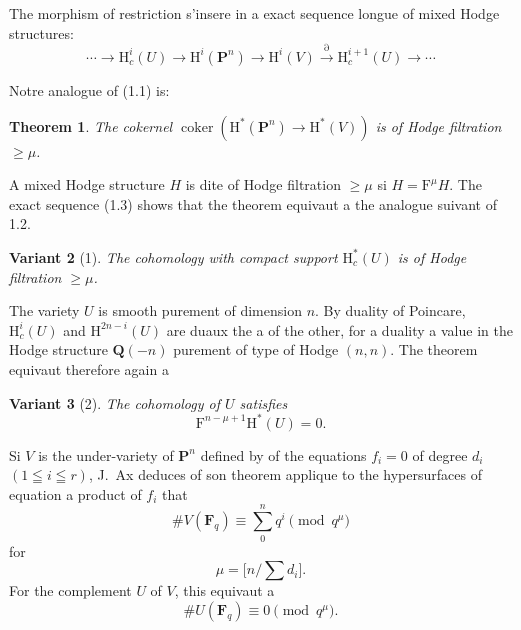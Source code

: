 \documentclass[12pt,a4paper]{article}
\theoremstyle{plain}
\newtheorem{theorem}{Theorem}
\newtheorem{variante}[theorem]{Variant}
\theoremstyle{definition}
\DeclareMathOperator{\Coker}{coker}
\begin{document}
The morphism of restriction s'insere in a exact sequence longue of mixed Hodge structures:
\begin{equation}\label{eq:1.3}
\cdots \to \mathrm{H}_c^i(U) \to \mathrm{H}^i(\mathbf{P}^n) \to \mathrm{H}^i(V) \xrightarrow{\partial} \mathrm{H}_c^{i+1}(U) \to \cdots
\tag{1.3}
\end{equation}

Notre analogue of (1.1) is:

\begin{theorem}
The cokernel $\Coker(\mathrm{H}^*(\mathbf{P}^n) \to \mathrm{H}^*(V))$ is of Hodge filtration $\ge \mu$.
\end{theorem}

A mixed Hodge structure $H$ is dite of Hodge filtration $\ge \mu$ si $H = \mathrm{F}^\mu H$. The exact sequence (1.3) shows that the theorem equivaut a the analogue suivant of 1.2.

\begin{variante}[1]
The cohomology with compact support $\mathrm{H}_c^*(U)$ is of Hodge filtration $\ge \mu$.
\end{variante}

The variety $U$ is smooth purement of dimension $n$. By duality of Poincare, $\mathrm{H}_c^i(U)$ and $\mathrm{H}^{2n-i}(U)$ are duaux the a of the other, for a duality a value in the Hodge structure $\mathbf{Q}(-n)$ purement of type of Hodge $(n,n)$. The theorem equivaut therefore again a

\begin{variante}[2]
The cohomology of $U$ satisfies
\begin{equation}\label{eq:1.4}
\mathrm{F}^{n-\mu+1} \mathrm{H}^*(U) = 0.
\tag{1.4}
\end{equation}
\end{variante}

Si $V$ is the under-variety of $\mathbf{P}^n$ defined by of the equations $f_i = 0$ of degree $d_i$ $(1 \leqq i \leqq r)$, J.\ Ax deduces of son theorem applique to the hypersurfaces of equation a product of $f_i$ that
\begin{equation}\label{eq:1.5}
\# V(\mathbf{F}_q) \equiv \sum_0^n q^i \pmod{q^\mu}
\tag{1.5}
\end{equation}
for
\[
\mu = \bigl[n/\textstyle\sum d_i\bigr].
\]
For the complement $U$ of $V$, this equivaut a
\begin{equation}\label{eq:1.6}
\# U(\mathbf{F}_q) \equiv 0 \pmod{q^\mu}.
\tag{1.6}
\end{equation}
\end{document}
